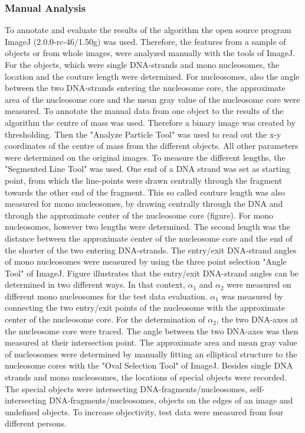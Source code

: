 \documentclass{article}
\begin{document}
\subsubsection{Manual Analysis}\label{sec:Manual Analysis}
To annotate and evaluate the results of the algorithm the open source program ImageJ (2.0.0-rc-46/1.50g) was used. Therefore, the features from a sample of objects or from whole images, were analyzed manually with the tools of ImageJ.
For the objects, which were single DNA-strands and mono nucleosomes, the location and the couture length were determined. For nucleosomes, also the angle between the two DNA-strands entering the nucleosome core, the approximate area of the nucleosome core and the mean gray value of the nucleosome core were measured.
To annotate the manual data from one object to the results of the algorithm the centre of mass was used. Therefore a binary image was created by thresholding. Then the "Analyze Particle Tool" was used to read out the x-y coordinates of the centre of mass from the different objects. 
All other parameters were determined on the original images. To measure the different lengths, the "Segmented Line Tool" was used. One end of a DNA strand was set as starting point, from which the line-points were drawn centrally through the fragment towards the other end of the fragment. This so called couture length was also measured for mono nucleosomes, by drawing centrally through the DNA and through the approximate center of the nucleosome core (figure). For mono nucleosomes, however two lengths were determined. The second length was the distance between the approximate center of the nucleosome core and the end of the shorter of the two entering DNA-strands.
The entry/exit DNA-strand angles of mono nucleosomes were measured by using the three point selection "Angle Tool" of ImageJ. Figure illustrates that the entry/exit DNA-strand angles can be determined in two different ways. In that context, $\alpha_1$ and $\alpha_2$ were measured on different mono nucleosomes for the test data evaluation.
$\alpha_1$ was measured by connecting the two entry/exit points of the nucleosome with the approximate center of the nucleosome core. For the determination of $\alpha_2$, the two DNA-axes at the nucleosome core were traced. The angle between the two DNA-axes was then measured at their intersection point.
The approximate area and mean gray value of nucleosomes were determined by manually fitting an elliptical structure to the nucleosome cores with the "Oval Selection Tool" of ImageJ.
Besides single DNA strands and mono nucleosomes, the locations of special objects were recorded. The special objects were intersecting DNA-fragments/nucleosomes, self-intersecting DNA-fragments/nucleosomes, objects on the edges of an image and undefined objects. To increase objectivity, test data were measured from four different persons.
\end{document}
